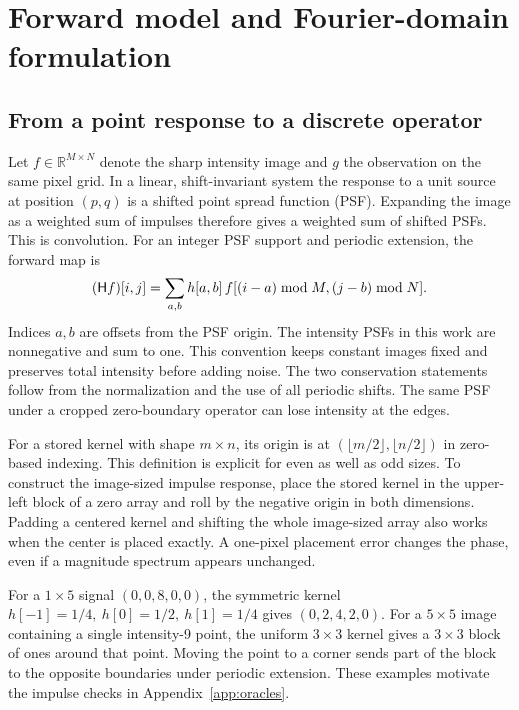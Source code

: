 \section{Forward model and Fourier-domain formulation}
\label{sec:model}

\subsection{From a point response to a discrete operator}

Let \(f\in\mathbb R^{M\times N}\) denote the sharp intensity image and \(g\) the observation on the same pixel grid. In a linear, shift-invariant system the response to a unit source at position \((p,q)\) is a shifted point spread function (PSF). Expanding the image as a weighted sum of impulses therefore gives a weighted sum of shifted PSFs. This is convolution. For an integer PSF support and periodic extension, the forward map is
\begin{equation}
(\mathsf H f)[i,j] = \sum_{a,b} h[a,b]\,
    f[(i-a)\bmod M,(j-b)\bmod N].
\label{eq:conv}
\end{equation}
Indices \(a,b\) are offsets from the PSF origin. The intensity PSFs in this work are nonnegative and sum to one. This convention keeps constant images fixed and preserves total intensity before adding noise. The two conservation statements follow from the normalization and the use of all periodic shifts. The same PSF under a cropped zero-boundary operator can lose intensity at the edges.

For a stored kernel with shape \(m\times n\), its origin is at \((\lfloor m/2\rfloor,\lfloor n/2\rfloor)\) in zero-based indexing. This definition is explicit for even as well as odd sizes. To construct the image-sized impulse response, place the stored kernel in the upper-left block of a zero array and roll by the negative origin in both dimensions. Padding a centered kernel and shifting the whole image-sized array also works when the center is placed exactly. A one-pixel placement error changes the phase, even if a magnitude spectrum appears unchanged.

For a \(1\times 5\) signal \((0,0,8,0,0)\), the symmetric kernel \(h[-1]=1/4,\ h[0]=1/2,\ h[1]=1/4\) gives \((0,2,4,2,0)\). For a \(5\times5\) image containing a single intensity-9 point, the uniform \(3\times3\) kernel gives a \(3\times3\) block of ones around that point. Moving the point to a corner sends part of the block to the opposite boundaries under periodic extension. These examples motivate the impulse checks in Appendix~\ref{app:oracles}.

